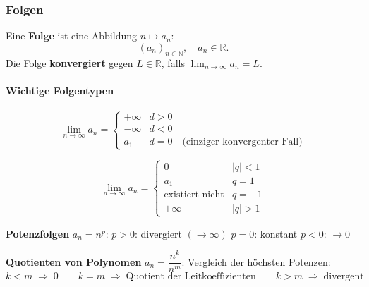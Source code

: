 \documentclass[../../zusammenfassung_AN.tex]{subfiles}
\begin{document}
	
	\subsubsection{Folgen}
	
	\begin{tcolorbox}[formelbox]
		Eine \textbf{Folge} ist eine Abbildung $n \mapsto a_n$:
		\[
		(a_n)_{n\in\mathbb{N}}, \quad a_n \in \mathbb{R}.
		\]
		Die Folge \textbf{konvergiert} gegen $L \in \mathbb{R}$, falls
		$\displaystyle\lim_{n\to\infty} a_n = L$.
	\end{tcolorbox}
	
	\paragraph{Wichtige Folgentypen}
	
	\begin{tcolorbox}[dglbox, title={Arithmetische Folge \quad $a_n = a_1 + (n-1)d$}]
		\[
		\lim_{n\to\infty} a_n =
		\begin{cases}
			+\infty & d>0 \\
			-\infty & d<0 \\
			a_1     & d=0 \quad \text{(einziger konvergenter Fall)}
		\end{cases}
		\]
	\end{tcolorbox}
	
	\begin{tcolorbox}[dglbox, title={Geometrische Folge \quad $a_n = a_1\,q^{n-1}$}]
		\[
		\lim_{n\to\infty} a_n =
		\begin{cases}
			0                        & |q|<1 \\
			a_1                      & q=1 \\
			\text{existiert nicht}   & q=-1 \\
			\pm\infty                & |q|>1
		\end{cases}
		\]
	\end{tcolorbox}
	
	\begin{tcolorbox}[formelbox]
		\textbf{Potenzfolgen} $a_n=n^p$: \quad
		$p>0$: divergiert $(\to\infty)$ \quad
		$p=0$: konstant \quad
		$p<0$: $\to 0$
		
		\medskip
		\textbf{Quotienten von Polynomen} $a_n = \dfrac{n^k}{n^m}$: Vergleich der höchsten Potenzen:
		\[
		k < m \;\Rightarrow\; 0 \qquad
		k = m \;\Rightarrow\; \text{Quotient der Leitkoeffizienten} \qquad
		k > m \;\Rightarrow\; \text{divergent}
		\]
	\end{tcolorbox}
	
\end{document}
